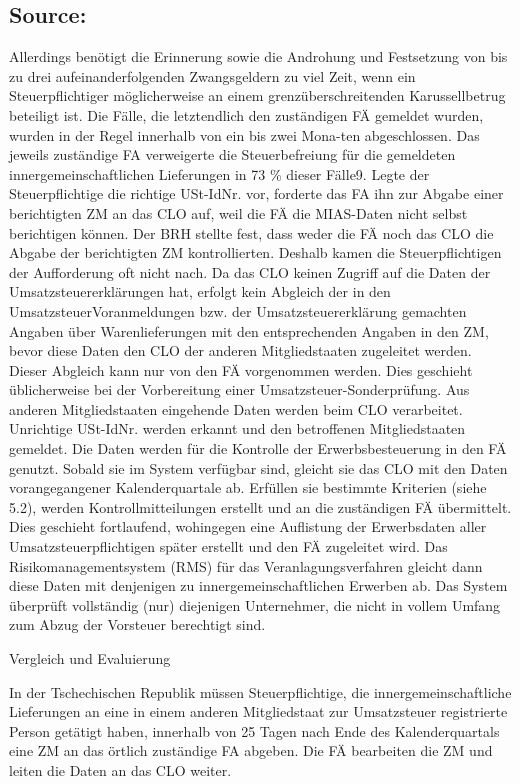 \documentclass[10pt]{article}
\begin{document}
\subsection*{Source:}

Allerdings benötigt die Erinnerung sowie die Androhung und Festsetzung von bis zu drei aufeinanderfolgenden Zwangsgeldern zu viel Zeit, wenn ein Steuerpﬂichtiger möglicherweise an einem grenzüberschreitenden Karussellbetrug beteiligt ist.
Die Fälle, die letztendlich den zuständigen FÄ gemeldet wurden, wurden in der Regel innerhalb von ein bis zwei Mona-ten abgeschlossen.
Das jeweils zuständige FA verweigerte die Steuerbefreiung für die gemeldeten innergemeinschaftlichen Lieferungen in 73 \% dieser Fälle9.
Legte der Steuerpﬂichtige die richtige USt-IdNr. vor, forderte das FA ihn zur Abgabe einer berichtigten ZM an das CLO auf, weil die FÄ die MIAS-Daten nicht selbst berichtigen können.
Der BRH stellte fest, dass weder die FÄ noch das CLO die Abgabe der berichtigten ZM kontrollierten.
Deshalb kamen die Steuerpﬂichtigen der Aufforderung oft nicht nach. Da das CLO keinen Zugriff auf die Daten der Umsatzsteuererklärungen hat, erfolgt kein Abgleich der in den UmsatzsteuerVoranmeldungen bzw. der Umsatzsteuererklärung gemachten Angaben über Warenlieferungen mit den entsprechenden Angaben in den ZM, bevor diese Daten den CLO der anderen Mitgliedstaaten zugeleitet werden.
Dieser Abgleich kann nur von den FÄ vorgenommen werden. Dies geschieht üblicherweise bei der Vorbereitung einer Umsatzsteuer-Sonderprüfung.
Aus anderen Mitgliedstaaten eingehende Daten werden beim CLO verarbeitet.
Unrichtige USt-IdNr. werden erkannt und den betroffenen Mitgliedstaaten gemeldet.
Die Daten werden für die Kontrolle der Erwerbsbesteuerung in den FÄ genutzt.
Sobald sie im System verfügbar sind, gleicht sie das CLO mit den Daten vorangegangener Kalenderquartale ab.
Erfüllen sie bestimmte Kriterien (siehe 5.2), werden Kontrollmitteilungen erstellt und an die zuständigen FÄ übermittelt.
Dies geschieht fortlaufend, wohingegen eine Auﬂistung der Erwerbsdaten aller Umsatzsteuerpﬂichtigen später erstellt und den FÄ zugeleitet wird.
Das Risikomanagementsystem (RMS) für das Veranlagungsverfahren gleicht dann diese Daten mit denjenigen zu innergemeinschaftlichen Erwerben ab.
Das System überprüft vollständig (nur) diejenigen Unternehmer, die nicht in vollem Umfang zum Abzug der Vorsteuer berechtigt sind.


Vergleich und Evaluierung

In der Tschechischen Republik müssen Steuerpﬂichtige, die innergemeinschaftliche Lieferungen an eine in einem anderen Mitgliedstaat zur Umsatzsteuer registrierte Person getätigt haben, innerhalb von 25 Tagen nach Ende des Kalenderquartals eine ZM an das örtlich zuständige FA abgeben.
Die FÄ bearbeiten die ZM und leiten die Daten an das CLO weiter.
\end{document}
